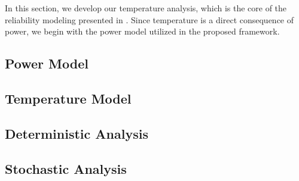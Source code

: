 In this section, we develop our temperature analysis, which is the core of the reliability modeling presented in .
Since temperature is a direct consequence of power, we begin with the power model utilized in the proposed framework.

\subsection{Power Model} 


\subsection{Temperature Model} 


\subsection{Deterministic Analysis} 


\subsection{Stochastic Analysis} 

